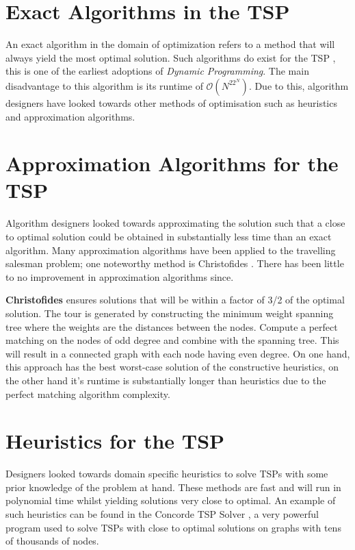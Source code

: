 \documentclass[]{UCD_CS_FYP_Report}
\begin{document}
\section{Exact Algorithms in the TSP}
An exact algorithm in the domain of optimization refers to a method that will always yield the most optimal solution. Such algorithms do exist for the TSP \cite{Bellman:1962:DPT:321105.321111}, this is one of the earliest adoptions of \textit{Dynamic Programming}. The main disadvantage to this algorithm is its runtime of $\mathcal{O}(N^22^N)$. Due to this, algorithm designers have looked towards other methods of optimisation such as heuristics and approximation algorithms.

\section{Approximation Algorithms for the TSP}
Algorithm designers looked towards approximating the solution such that a close to optimal solution could be obtained in substantially less time than an exact algorithm. Many approximation algorithms have been applied to the travelling salesman problem; one noteworthy method is Christofides \cite{JohnMcGe97}. There has been little to no improvement in approximation algorithms since. 

\textbf{Christofides} ensures solutions that will be within a factor of 3/2 of the optimal solution. The tour is generated by constructing the minimum weight spanning tree where the weights are the distances between the nodes. Compute a perfect matching on the nodes of odd degree and combine with the spanning tree. This will result in a connected graph with each node having even degree. On one hand, this approach has the best worst-case solution of the constructive heuristics, on the other hand it's runtime is substantially longer than heuristics due to the perfect matching algorithm complexity.

\section{Heuristics for the TSP}
Designers looked towards domain specific heuristics to solve TSPs with some prior knowledge of the problem at hand. These methods are fast and will run in polynomial time whilst yielding solutions very close to optimal. An example of such heuristics can be found in the Concorde TSP Solver \cite{davidapplegate2007}, a very powerful program used to solve TSPs with close to optimal solutions on graphs with tens of thousands of nodes.
\end{document}
